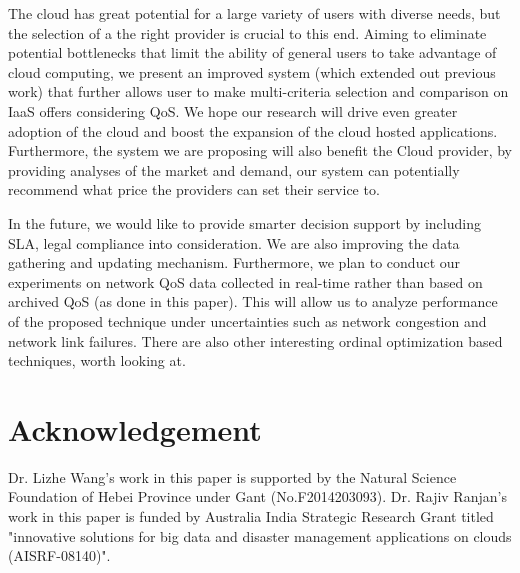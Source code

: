 \documentclass[journal]{IEEEtran}
\begin{document}
The cloud has great potential for a large variety of users with diverse needs, but the selection of a the right provider is crucial to this end. Aiming to eliminate potential bottlenecks that limit the ability of general users to take advantage of cloud computing, we present an improved system (which extended out previous work) that further allows user to make multi-criteria selection and comparison on IaaS offers considering QoS. We hope our research will drive even greater adoption of the cloud and boost the expansion of the cloud hosted applications. Furthermore, the system we are proposing will also benefit the Cloud provider, by providing analyses of the market and demand, our system can potentially recommend what price the providers can set their service to.


In the future, we would like to provide smarter decision support by including SLA, legal compliance    \cite{mouratidis2013framework} into consideration. We are also improving the data gathering and updating mechanism. Furthermore, we plan to conduct our experiments on network QoS data collected in real-time rather than based on archived QoS (as done in this paper). This will allow us to analyze performance of the proposed technique under uncertainties such as network congestion and network link failures. There are also other interesting ordinal optimization based techniques\cite{OOZhang2014}, \cite{MOSZhang2014309} worth looking at.
 
\section{Acknowledgement}
Dr. Lizhe Wang's work in this paper is supported by  the Natural Science Foundation of Hebei Province under Gant (No.F2014203093).
Dr. Rajiv Ranjan's work in this paper is funded by Australia India Strategic Research Grant titled "innovative solutions for big data and disaster management applications on clouds (AISRF-08140)".



\end{document}
